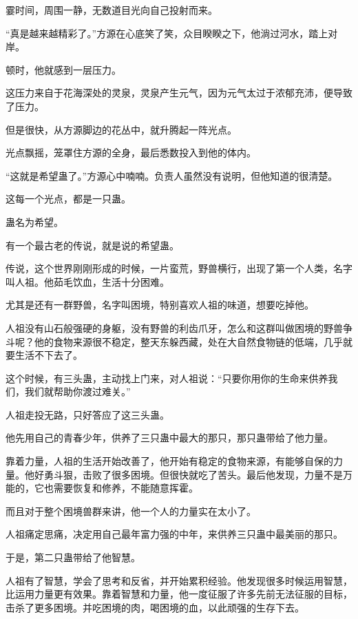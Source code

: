 
\begin{this_body}



霎时间，周围一静，无数道目光向自己投射而来。

“真是越来越精彩了。”方源在心底笑了笑，众目睽睽之下，他淌过河水，踏上对岸。

顿时，他就感到一层压力。

这压力来自于花海深处的灵泉，灵泉产生元气，因为元气太过于浓郁充沛，便导致了压力。

但是很快，从方源脚边的花丛中，就升腾起一阵光点。

光点飘摇，笼罩住方源的全身，最后悉数投入到他的体内。

“这就是希望蛊了。”方源心中喃喃。负责人虽然没有说明，但他知道的很清楚。

这每一个光点，都是一只蛊。

蛊名为希望。

有一个最古老的传说，就是说的希望蛊。

传说，这个世界刚刚形成的时候，一片蛮荒，野兽横行，出现了第一个人类，名字叫人祖。他茹毛饮血，生活十分困难。

尤其是还有一群野兽，名字叫困境，特别喜欢人祖的味道，想要吃掉他。

人祖没有山石般强硬的身躯，没有野兽的利齿爪牙，怎么和这群叫做困境的野兽争斗呢？他的食物来源很不稳定，整天东躲西藏，处在大自然食物链的低端，几乎就要生活不下去了。

这个时候，有三头蛊，主动找上门来，对人祖说：“只要你用你的生命来供养我们，我们就帮助你渡过难关。”

人祖走投无路，只好答应了这三头蛊。

他先用自己的青春少年，供养了三只蛊中最大的那只，那只蛊带给了他力量。

靠着力量，人祖的生活开始改善了，他开始有稳定的食物来源，有能够自保的力量。他好勇斗狠，击败了很多困境。但很快就吃了苦头。最后他发现，力量不是万能的，它也需要恢复和修养，不能随意挥霍。

而且对于整个困境兽群来讲，他一个人的力量实在太小了。

人祖痛定思痛，决定用自己最年富力强的中年，来供养三只蛊中最美丽的那只。

于是，第二只蛊带给了他智慧。

人祖有了智慧，学会了思考和反省，并开始累积经验。他发现很多时候运用智慧，比运用力量更有效果。靠着智慧和力量，他一度征服了许多先前无法征服的目标，击杀了更多困境。并吃困境的肉，喝困境的血，以此顽强的生存下去。


\end{this_body}
